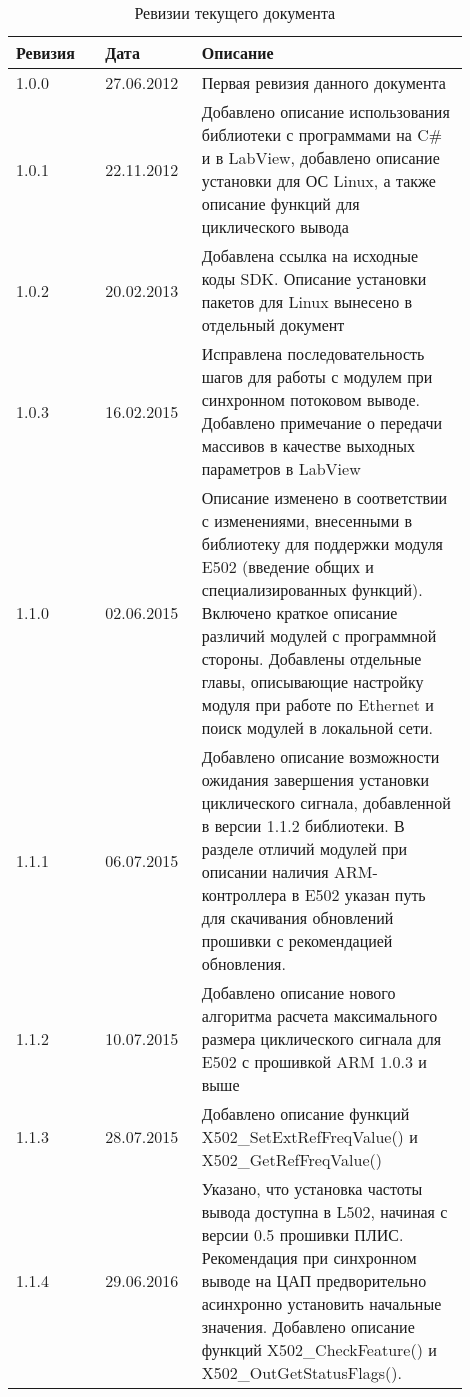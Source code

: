 \documentclass[12pt,a4paper,titlepage]{report}
\begin{document}
  
  \begin{longtable}{|m{0.18\linewidth}|m{0.18\linewidth}|m{0.54\linewidth}|}
  \caption{Ревизии текущего документа}\\\hline
  \textbf{Ревизия} & \textbf{Дата} & \textbf{Описание}\\\hline
  1.0.0            & 27.06.2012    & Первая ревизия данного документа \\\hline
  1.0.1            & 22.11.2012    & Добавлено описание использования библиотеки с программами на C\# и в LabView, добавлено описание установки для ОС Linux, а также описание функций для циклического вывода \\\hline
  1.0.2            & 20.02.2013    & Добавлена ссылка на исходные коды SDK. Описание установки пакетов для Linux вынесено в отдельный документ \\\hline
  1.0.3            & 16.02.2015    & Исправлена последовательность шагов для работы с модулем при синхронном потоковом выводе. Добавлено примечание о передачи массивов в качестве выходных параметров в LabView \\\hline
  1.1.0            & 02.06.2015    & Описание изменено в соответствии с изменениями, внесенными в библиотеку для поддержки модуля E502 (введение общих и специализированных функций). Включено краткое описание различий модулей с программной стороны. Добавлены отдельные главы, описывающие настройку модуля при работе по Ethernet и поиск модулей в локальной сети. \\\hline
  1.1.1            & 06.07.2015    & Добавлено описание возможности ожидания завершения установки циклического сигнала, добавленной в версии 1.1.2 библиотеки. В разделе отличий модулей при описании наличия ARM-контроллера в E502 указан путь для скачивания обновлений прошивки с рекомендацией обновления. \\\hline
  1.1.2            & 10.07.2015    & Добавлено описание нового алгоритма расчета максимального размера циклического сигнала для E502 с прошивкой ARM 1.0.3 и выше \\\hline
  1.1.3            & 28.07.2015    & Добавлено описание функций X502\_SetExtRefFreqValue() и X502\_GetRefFreqValue() \\\hline
  1.1.4            & 29.06.2016    & Указано, что установка частоты вывода доступна в L502, начиная с версии 0.5 прошивки ПЛИС. Рекомендация при синхронном выводе на ЦАП предворительно асинхронно установить начальные значения. Добавлено описание функций X502\_CheckFeature() и X502\_OutGetStatusFlags(). \\\hline
  \end{longtable}
  \newpage  
  
\end{document}
